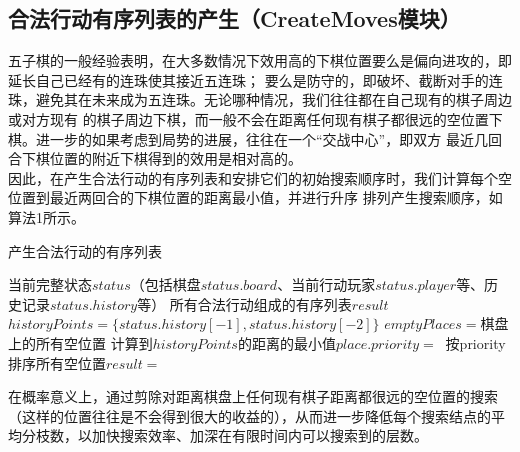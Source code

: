 \documentclass{acm_proc_article-sp}
\begin{document}
\subsection{\textbf{合法行动有序列表的产生（CreateMoves模块）}}
五子棋的一般经验表明，在大多数情况下效用高的下棋位置要么是偏向进攻的，即延长自己已经有的连珠使其接近五连珠；
要么是防守的，即破坏、截断对手的连珠，避免其在未来成为五连珠。无论哪种情况，我们往往都在自己现有的棋子周边或对方现有
的棋子周边下棋，而一般不会在距离任何现有棋子都很远的空位置下棋。进一步的如果考虑到局势的进展，往往在一个“交战中心”，即双方
最近几回合下棋位置的附近下棋得到的效用是相对高的。\\
因此，在产生合法行动的有序列表和安排它们的初始搜索顺序时，我们计算每个空位置到最近两回合的下棋位置的距离最小值，并进行升序
排列产生搜索顺序，如算法1所示。
\begin{algorithm}
       \algsetup{\tiny}
       \scriptsize
       \caption{产生合法行动的有序列表}
       \begin{algorithmic}[1] %
              \Require 当前完整状态$status$（包括棋盘$status.board$、当前行动玩家$status.player$等、历史记录$status.history$等）
              \Ensure 所有合法行动组成的有序列表$result$
                     \State $historyPoints = \{status.history[-1], status.history[-2]\}$
                     \State $emptyPlaces = $棋盘上的所有空位置
                            \State 计算到$historyPoints$的距离的最小值$place.priority =\ $
                     \EndFor
                     \State 按priority排序所有空位置$result =\ $
                     \State {}
              \EndFunction
       \end{algorithmic}
\end{algorithm}


在概率意义上，通过剪除对距离棋盘上任何现有棋子距离都很远的空位置的搜索
（这样的位置往往是不会得到很大的收益的），从而进一步降低每个搜索结点的平均分枝数，以加快搜索效率、加深在有限时间内可以搜索到的层数。\\
\end{document}
